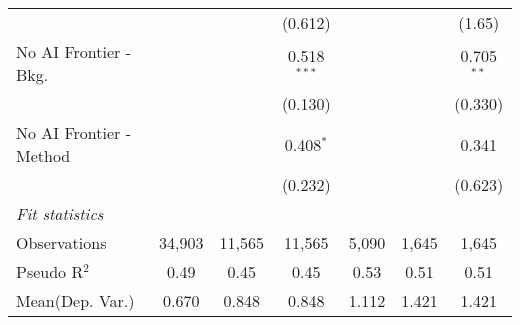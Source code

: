 \begin{tabular}{lcccccc}
                           &               &               & (0.612)       &              &         & (1.65)\\   
   No AI Frontier - Bkg.   &               &               & 0.518$^{***}$ &              &         & 0.705$^{**}$\\   
                           &               &               & (0.130)       &              &         & (0.330)\\   
   No AI Frontier - Method &               &               & 0.408$^{*}$   &              &         & 0.341\\   
                           &               &               & (0.232)       &              &         & (0.623)\\   
   \midrule
   \emph{Fit statistics}\\
   Observations            & 34,903        & 11,565        & 11,565        & 5,090        & 1,645   & 1,645\\  
   Pseudo R$^2$            & 0.49          & 0.45          & 0.45          & 0.53         & 0.51    & 0.51\\  
Mean(Dep. Var.) & 0.670 & 0.848 & 0.848 & 1.112 & 1.421 & 1.421 \\
   

\end{tabular}
